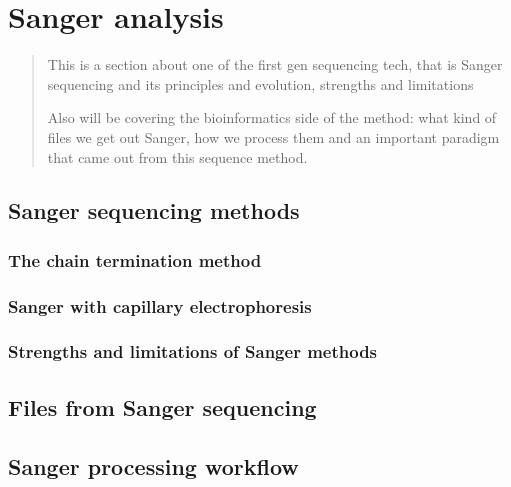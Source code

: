 \documentclass[
  letterpaper,
  DIV=11,
  numbers=noendperiod,
  oneside]{scrreprt}
\begin{document}
\hypertarget{sec-sanger}{%
\chapter{Sanger analysis}\label{sec-sanger}}

\begin{quote}
This is a section about one of the first gen sequencing tech, that is
Sanger sequencing and its principles and evolution, strengths and
limitations

Also will be covering the bioinformatics side of the method: what kind
of files we get out Sanger, how we process them and an important
paradigm that came out from this sequence method.
\end{quote}

\hypertarget{sanger-sequencing-methods}{%
\section{Sanger sequencing methods}\label{sanger-sequencing-methods}}

\hypertarget{the-chain-termination-method}{%
\subsection{The chain termination
method}\label{the-chain-termination-method}}

\hypertarget{sanger-with-capillary-electrophoresis}{%
\subsection{Sanger with capillary
electrophoresis}\label{sanger-with-capillary-electrophoresis}}

\hypertarget{strengths-and-limitations-of-sanger-methods}{%
\subsection{Strengths and limitations of Sanger
methods}\label{strengths-and-limitations-of-sanger-methods}}

\hypertarget{files-from-sanger-sequencing}{%
\section{Files from Sanger
sequencing}\label{files-from-sanger-sequencing}}

\hypertarget{sanger-processing-workflow}{%
\section{Sanger processing workflow}\label{sanger-processing-workflow}}
\end{document}
